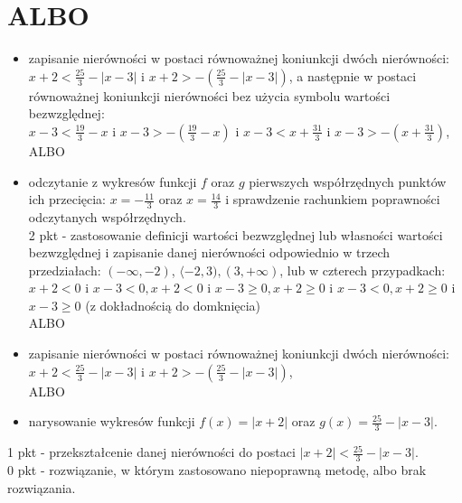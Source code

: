 \documentclass[10pt]{article}
\begin{document}
\section*{ALBO}
\begin{itemize}
  \item zapisanie nierówności w postaci równoważnej koniunkcji dwóch nierówności:\\
$x+2<\frac{25}{3}-|x-3|$ i $x+2>-\left(\frac{25}{3}-|x-3|\right)$, a następnie w postaci równoważnej koniunkcji nierówności bez użycia symbolu wartości bezwzględnej:\\
$x-3<\frac{19}{3}-x$ i $x-3>-\left(\frac{19}{3}-x\right)$ i $x-3<x+\frac{31}{3}$ i $x-3>-\left(x+\frac{31}{3}\right)$, ALBO
  \item odczytanie z wykresów funkcji $f$ oraz $g$ pierwszych współrzędnych punktów ich przecięcia: $x=-\frac{11}{3}$ oraz $x=\frac{14}{3}$ i sprawdzenie rachunkiem poprawności odczytanych współrzędnych.\\
2 pkt - zastosowanie definicji wartości bezwzględnej lub własności wartości bezwzględnej i zapisanie danej nierówności odpowiednio w trzech przedziałach: $(-\infty,-2)$, $\langle-2,3),(3,+\infty)$, lub w czterech przypadkach: $x+2<0$ i $x-3<0, x+2<0$ i $x-3 \geq 0, x+2 \geq 0$ i $x-3<0, x+2 \geq 0$ i $x-3 \geq 0$ (z dokładnością do domknięcia)\\
ALBO
  \item zapisanie nierówności w postaci równoważnej koniunkcji dwóch nierówności:\\
$x+2<\frac{25}{3}-|x-3|$ i $x+2>-\left(\frac{25}{3}-|x-3|\right)$,\\
ALBO
  \item narysowanie wykresów funkcji $f(x)=|x+2|$ oraz $g(x)=\frac{25}{3}-|x-3|$.
\end{itemize}

1 pkt - przekształcenie danej nierówności do postaci $|x+2|<\frac{25}{3}-|x-3|$.\\
0 pkt - rozwiązanie, w którym zastosowano niepoprawną metodę, albo brak rozwiązania.
\end{document}
